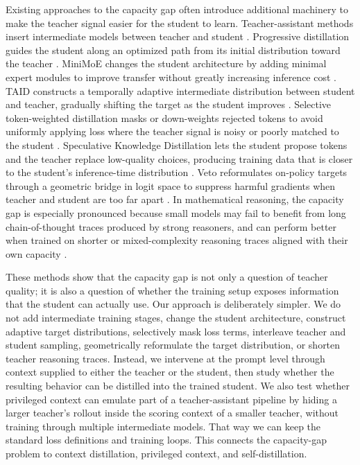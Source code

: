 Existing approaches to the capacity gap often introduce additional machinery to make the teacher signal easier for the student to learn. Teacher-assistant methods insert intermediate models between teacher and student \citep{mirzadehImprovedKnowledgeDistillation2019}. Progressive distillation guides the student along an optimized path from its initial distribution toward the teacher \citep{shi2021FollowYourPath}. MiniMoE changes the student architecture by adding minimal expert modules to improve transfer without greatly increasing inference cost \citep{zhangLiftingCurseCapacity2023}. TAID constructs a temporally adaptive intermediate distribution between student and teacher, gradually shifting the target as the student improves \citep{shingTAIDTemporallyAdaptive2025}. Selective token-weighted distillation masks or down-weights rejected tokens to avoid uniformly applying loss where the teacher signal is noisy or poorly matched to the student \citep{huang2025SelecTKDSelectiveTokenWeighted}. Speculative Knowledge Distillation lets the student propose tokens and the teacher replace low-quality choices, producing training data that is closer to the student's inference-time distribution \citep{xu2024SpeculativeKnowledgeDistillation}. Veto reformulates on-policy targets through a geometric bridge in logit space to suppress harmful gradients when teacher and student are too far apart \citep{jang2026StableOnPolicyDistillation}. In mathematical reasoning, the capacity gap is especially pronounced because small models may fail to benefit from long chain-of-thought traces produced by strong reasoners, and can perform better when trained on shorter or mixed-complexity reasoning traces aligned with their own capacity \citep{liSmallModelsStruggle2025}.

These methods show that the capacity gap is not only a question of teacher quality; it is also a question of whether the training setup exposes information that the student can actually use. Our approach is deliberately simpler. We do not add intermediate training stages, change the student architecture, construct adaptive target distributions, selectively mask loss terms, interleave teacher and student sampling, geometrically reformulate the target distribution, or shorten teacher reasoning traces. Instead, we intervene at the prompt level through context supplied to either the teacher or the student, then study whether the resulting behavior can be distilled into the trained student. We also test whether privileged context can emulate part of a teacher-assistant pipeline by hiding a larger teacher's rollout inside the scoring context of a smaller teacher, without training through multiple intermediate models. That way we can keep the standard loss definitions and training loops. This connects the capacity-gap problem to context distillation, privileged context, and self-distillation.

